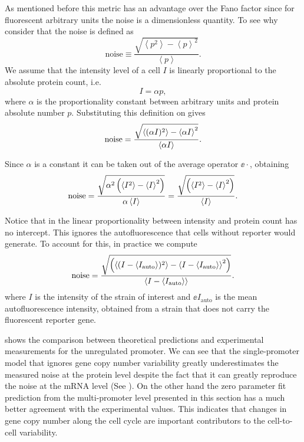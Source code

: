 As mentioned before this metric has an advantage over the Fano factor since for
fluorescent arbitrary units the noise is a dimensionless quantity. To see
why consider that the noise is defined as
\begin{equation}
\text{noise} \equiv \frac{\sqrt{\left\langle p^2 \right\rangle -
                        \left\langle p \right\rangle^2}}
                        {\left\langle p \right\rangle}.
    \label{seq_noise_protein}
\end{equation}
We assume that the intensity level of a cell $I$ is linearly proportional to
the absolute protein count, i.e.
\begin{equation}
I = \alpha p,
\label{seq_calibration_factor}
\end{equation}
where $\alpha$ is the proportionality constant between arbitrary units and
protein absolute number $p$. Substituting this definition on
 gives
\begin{equation}
  \text{noise} = {\sqrt{\left\langle (\alpha I)^2 \right\rangle - \left\langle \alpha I \right\rangle^2} \over
                \left\langle \alpha I \right\rangle}.
\end{equation}

Since $\alpha$ is a constant it can be taken out of the average operator
$\ee{\cdot}$, obtaining
\begin{equation}
  \text{noise} = {\sqrt{\alpha^2 \left(\left\langle I^2 \right\rangle -
                \left\langle I \right\rangle^2 \right)} \over
                \alpha \left\langle I \right\rangle}
       = {\sqrt{\left(\left\langle I^2 \right\rangle - \left\langle I \right\rangle^2 \right)} \over
                \left\langle I \right\rangle}.
\end{equation}

Notice that in  the linear proportionality between
intensity and protein count has no intercept. This ignores the autofluorescence
that cells without reporter would generate. To account for this, in practice we
compute
\begin{equation}
\text{noise} = {\sqrt{\left(\left\langle (I - \left\langle I_\text{auto} \right\rangle)^2 \right\rangle -
                    \left\langle I - \left\langle I_\text{auto} \right\rangle \right\rangle^2 \right)} \over
                \left\langle I - \left\langle I_\text{auto} \right\rangle \right\rangle}.
\end{equation}
where $I$ is the intensity of the strain of interest and $\ee{I_\text{auto}}$ is
the mean autofluorescence intensity, obtained from a strain that does not carry
the fluorescent reporter gene.

 shows the comparison between theoretical predictions and
experimental measurements for the unregulated promoter. We can see that the
single-promoter model that ignores gene copy number variability greatly
underestimates the measured noise at the protein level despite the fact that it
can greatly reproduce the noise at the mRNA level (See
). On the other hand the zero parameter fit
prediction from the multi-promoter level presented in this section has a much
better agreement with the experimental values. This indicates that changes in
gene copy number along the cell cycle are important contributors to the
cell-to-cell variability.

